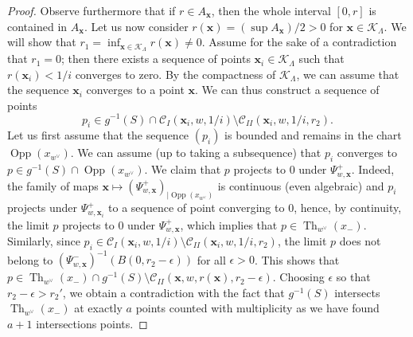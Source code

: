 \documentclass[12pt]{amsbook}%
\theoremstyle{definition}
\theoremstyle{remark}
\numberwithin{section}{chapter}
\numberwithin{subsection}{section}
\numberwithin{figure}{chapter}
\DeclareMathOperator{\Th}{Th}
\DeclareMathOperator{\Opp}{Opp}
\def\bx{\mathbf{x}}
\begin{document}
{{\begin{proof}
  Observe furthermore that if $r \in A_{\bx}$, then the whole interval $[0,r]$ is contained in $A_{\bx}$. Let us now consider $r(\bx) = (\sup A_{\bx})/2 > 0 $ for $\bx \in \mathcal{K}_{\Lambda}$.  
We will show that $r_1 =\inf_{\bx \in \mathcal{K}_{\Lambda}} r(\bx) \neq 0$. 
Assume for the sake of a contradiction that $r_1 = 0 $; then there exists a sequence of points 
$\bx_i \in \mathcal{K}_{\Lambda}$ such that $r(\bx_i)< 1/i$ converges to zero. 
By the compactness of $\mathcal{K}_{\Lambda}$, we can assume that the sequence $\bx_i$ converges to a point $\bx$. We can thus construct a sequence of points 
$$
p_i \in g^{-1}(S) \cap \mathcal{C}_I(\bx_i ,w, 1/i) \setminus \mathcal{C}_{II}(\bx_i ,w, 1/i,r_2).
$$ 
Let us first assume that the sequence $(p_i)$ is bounded and remains in the chart $\Opp(x_{w^\vee})$. 
We can  assume (up to taking a subsequence) that $p_i$ converges to $p \in g^{-1}(S) \cap \Opp(x_{w^\vee})$. We claim  that $p$ projects to $0$ under $\Psi_{w, \bx}^+$. Indeed, the family of maps $\bx \mapsto (\Psi_{w,\bx}^+)_{| \Opp(x_{w^\vee})} $ is continuous (even algebraic) and $p_i$ projects under $\Psi_{w,\bx_i}^+$ to a sequence of point converging to $0$, hence, by continuity, the limit $p$ projects to $0$ under $\Psi_{w,\bx}^+$, which implies that $p \in \Th_{w^{\vee}}(x_-)$. 
Similarly, since $p_i \in \mathcal{C}_{I}(\bx_i,w, 1/i) \setminus \mathcal{C}_{II}(\bx_i , w ,1/i , r_2)$, the limit $p$ does not belong to $(\Psi_{w,\bx}^-)^{-1} (B(0,r_2 - \epsilon))$ for all $\epsilon>0$. This shows that $p \in \Th_{w^\vee}(x_-) \cap g^{-1}(S) \setminus \mathcal{C}_{II}(\bx,w , r(\bx), r_2 - \epsilon)$. 
Choosing $\epsilon$ so that $r_2 - \epsilon > r_2'$, we obtain 
a contradiction with the fact that  $g^{-1}(S) $ intersects $\Th_{w^\vee}(x_-)$ at exactly $a$ points counted with multiplicity as we have found $a+1$ intersections points. 


\end{proof}}}
\end{document}
